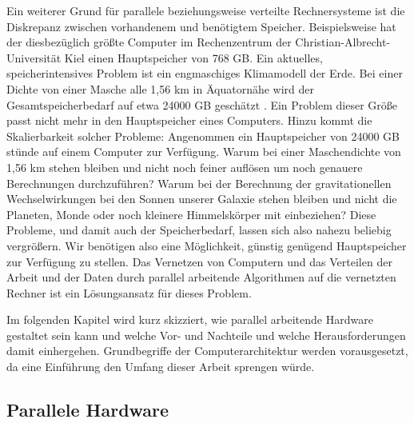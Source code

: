     Ein weiterer Grund für parallele beziehungsweise verteilte Rechnersysteme ist die Diskrepanz zwischen vorhandenem und benötigtem Speicher. Beispielsweise hat der diesbezüglich größte
    Computer im Rechenzentrum der Christian-Albrecht-Universität Kiel einen Hauptspeicher von 768 GB. Ein aktuelles, speicherintensives Problem ist ein engmaschiges 
    Klimamodell der Erde. Bei einer Dichte von einer Masche alle 1,56 km in Äquatornähe wird der Gesamtspeicherbedarf auf etwa 24000 GB geschätzt \citep{climate}. Ein Problem
    dieser Größe passt nicht mehr in den Hauptspeicher eines Computers.
    Hinzu kommt die Skalierbarkeit solcher Probleme: Angenommen ein Hauptspeicher von 24000 GB stünde auf einem Computer zur Verfügung. Warum bei einer Maschendichte von 
    1,56 km stehen bleiben und nicht noch feiner auflösen um noch genauere Berechnungen durchzuführen?
    Warum bei der Berechnung der gravitationellen Wechselwirkungen bei den Sonnen unserer Galaxie stehen bleiben und nicht die Planeten, Monde oder noch kleinere Himmelskörper mit einbeziehen? 
    Diese Probleme, und damit auch der Speicherbedarf, lassen sich also nahezu beliebig vergrößern. Wir benötigen also eine Möglichkeit, günstig genügend Hauptspeicher zur Verfügung zu stellen.
    Das Vernetzen von Computern und das Verteilen der Arbeit und der Daten durch parallel arbeitende Algorithmen auf die vernetzten Rechner ist ein Lösungsansatz für dieses Problem.
    
    Im folgenden Kapitel wird kurz skizziert, wie parallel arbeitende Hardware gestaltet sein kann und welche Vor- und Nachteile und welche Herausforderungen damit einhergehen. Grundbegriffe
    der Computerarchitektur werden vorausgesetzt, da eine Einführung den Umfang dieser Arbeit sprengen würde.
    
    \subsection{Parallele Hardware}
    \label{sec:parhard}
